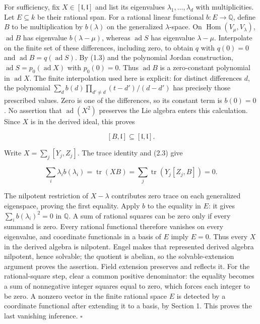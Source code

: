 \documentclass[11pt,a4paper,openany]{report}
\begin{document}
For sufficiency, fix \(X\in[\mathfrak l,\mathfrak l]\) and list its eigenvalues \(\lambda_1,\ldots,\lambda_d\) with multiplicities. Let \(E\subseteq k\) be their rational span. For a rational linear functional \(b:E\to\mathbb Q\), define \(B\) to be multiplication by \(b(\lambda)\) on the generalized \(\lambda\)-space. On \(\operatorname{Hom}(V_\mu,V_\lambda)\), \(\operatorname{ad}B\) has eigenvalue \(b(\lambda-\mu)\), whereas \(\operatorname{ad}S\) has eigenvalue \(\lambda-\mu\). Interpolate on the finite set of these differences, including zero, to obtain \(q\) with \(q(0)=0\) and \(\operatorname{ad}B=q(\operatorname{ad}S)\). By (1.3) and the polynomial Jordan construction, \(\operatorname{ad}S=p_0(\operatorname{ad}X)\) with \(p_0(0)=0\). Thus \(\operatorname{ad}B\) is a zero-constant polynomial in \(\operatorname{ad}X\). The finite interpolation used here is explicit: for distinct differences \(d\), the polynomial \(\sum_d b(d)\prod_{d'\ne d}(t-d')/(d-d')\) has precisely those prescribed values. Zero is one of the differences, so its constant term is \(b(0)=0\). No assertion that \(\operatorname{ad}(X^2)\) preserves the Lie algebra enters this calculation. Since \(X\) is in the derived ideal, this proves

\[
[B,\mathfrak l]\subseteq[\mathfrak l,\mathfrak l].
\tag{2.3}
\]

Write \(X=\sum_j[Y_j,Z_j]\). The trace identity and (2.3) give

\[
\sum_i\lambda_i b(\lambda_i)
=\operatorname{tr}(XB)
=\sum_j\operatorname{tr}(Y_j[Z_j,B])=0.
\tag{2.4}
\]

The nilpotent restriction of \(X-\lambda\) contributes zero trace on each generalized eigenspace, proving the first equality. Apply \(b\) to the equality in \(E\): it gives \(\sum_i b(\lambda_i)^2=0\) in \(\mathbb Q\). A sum of rational squares can be zero only if every summand is zero. Every rational functional therefore vanishes on every eigenvalue, and coordinate functionals in a basis of \(E\) imply \(E=0\). Thus every \(X\) in the derived algebra is nilpotent. Engel makes that represented derived algebra nilpotent, hence solvable; the quotient is abelian, so the solvable-extension argument proves the assertion. Field extension preserves and reflects it. For the rational-square step, clear a common positive denominator: the equality becomes a sum of nonnegative integer squares equal to zero, which forces each integer to be zero. A nonzero vector in the finite rational space \(E\) is detected by a coordinate functional after extending it to a basis, by Section 1. This proves the last vanishing inference. \(\square\)
\end{document}
